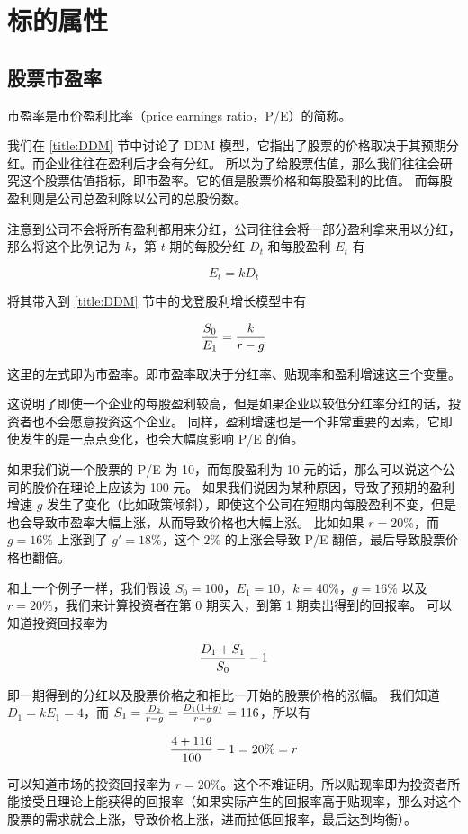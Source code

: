 \documentclass[utf8,a4paper,nofonts,9pt]{ctexbook}
\begin{document}
\section{标的属性}

\subsection{股票市盈率}

市盈率是市价盈利比率（price earnings ratio，P/E）的简称。

我们在 \ref{title:DDM} 节中讨论了 DDM 模型，它指出了股票的价格取决于其预期分红。而企业往往在盈利后才会有分红。
所以为了给股票估值，那么我们往往会研究这个股票估值指标，即市盈率。它的值是股票价格和每股盈利的比值。
而每股盈利则是公司总盈利除以公司的总股份数。

注意到公司不会将所有盈利都用来分红，公司往往会将一部分盈利拿来用以分红，那么将这个比例记为 $k$，第 $t$ 期的每股分红 $D_t$ 和每股盈利 $E_t$ 有

$$
E_t = kD_t
$$

将其带入到 \ref{title:DDM} 节中的戈登股利增长模型中有

$$
{S_0 \over E_1} = {k \over r - g}
$$

这里的左式即为市盈率。即市盈率取决于分红率、贴现率和盈利增速这三个变量。

这说明了即使一个企业的每股盈利较高，但是如果企业以较低分红率分红的话，投资者也不会愿意投资这个企业。
同样，盈利增速也是一个非常重要的因素，它即使发生的是一点点变化，也会大幅度影响 P/E 的值。

\begin{exampleBox}
如果我们说一个股票的 P/E 为 10，而每股盈利为 10 元的话，那么可以说这个公司的股价在理论上应该为 100 元。
如果我们说因为某种原因，导致了预期的盈利增速 $g$ 发生了变化（比如政策倾斜），即使这个公司在短期内每股盈利不变，但是也会导致市盈率大幅上涨，从而导致价格也大幅上涨。
比如如果 $r = 20\%$，而 $g = 16\%$ 上涨到了 $g' = 18\%$，这个 $2\%$ 的上涨会导致 P/E 翻倍，最后导致股票价格也翻倍。
\end{exampleBox}

\begin{exampleBox}
和上一个例子一样，我们假设 $S_0 = 100$，$E_1 = 10$，$k = 40\%$，$g = 16\%$ 以及 $r = 20\%$，我们来计算投资者在第 0 期买入，到第 1 期卖出得到的回报率。
可以知道投资回报率为

$$
{D_1 + S_1 \over S_0} - 1
$$

即一期得到的分红以及股票价格之和相比一开始的股票价格的涨幅。
我们知道 $D_1 = k E_1 = 4$，而 $S_1 = {D_2 \over r - g} = {D_1 (1 + g) \over r - g} = 116$，所以有

$$
{4 + 116 \over 100} - 1 = 20\% = r
$$

可以知道市场的投资回报率为 $r = 20\%$。这个不难证明。所以贴现率即为投资者所能接受且理论上能获得的回报率（如果实际产生的回报率高于贴现率，那么对这个股票的需求就会上涨，导致价格上涨，进而拉低回报率，最后达到均衡）。
\end{exampleBox}
\end{document}
